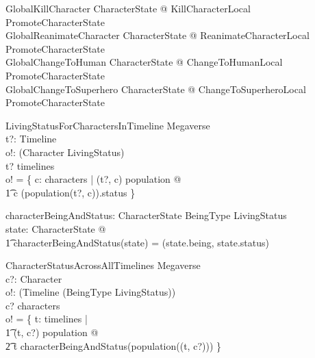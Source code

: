 \documentclass{article}
\begin{document}
\begin{zed}
GlobalKillCharacter  \exists \Delta CharacterState @ KillCharacterLocal \land PromoteCharacterState \\
GlobalReanimateCharacter  \exists \Delta CharacterState @ ReanimateCharacterLocal \land PromoteCharacterState \\
GlobalChangeToHuman  \exists \Delta CharacterState @ ChangeToHumanLocal \land PromoteCharacterState \\
GlobalChangeToSuperhero  \exists \Delta CharacterState @ ChangeToSuperheroLocal \land PromoteCharacterState \\
\end{zed}

\begin{schema}{LivingStatusForCharactersInTimeline}
\Xi Megaverse \\
t?: Timeline \\ 
o!: \power (Character \cross LivingStatus) \\
\where 
t? \in timelines \\
o! = \{ c: characters | (t?, c) \in \dom population @ \\
\t1 c \mapsto (population(t?, c)).status 
\} \\ 
\end{schema}

\begin{axdef}
characterBeingAndStatus: CharacterState \fun BeingType \cross LivingStatus \\
\where
\forall state: CharacterState @ \\
\t1 characterBeingAndStatus(state) = (state.being, state.status) \\
\end{axdef} 

\begin{schema}{CharacterStatusAcrossAllTimelines}
\Xi Megaverse \\
c?: Character \\ 
o!: \power (Timeline \cross (BeingType \cross LivingStatus)) \\
\where 
c? \in characters \\
o! = \{ t: timelines | \\
\t1 (t, c?) \in \dom population @  \\
\t2 t \mapsto characterBeingAndStatus(population((t, c?)))   
\} \\ 
\end{schema}

\pagebreak
\end{document}
